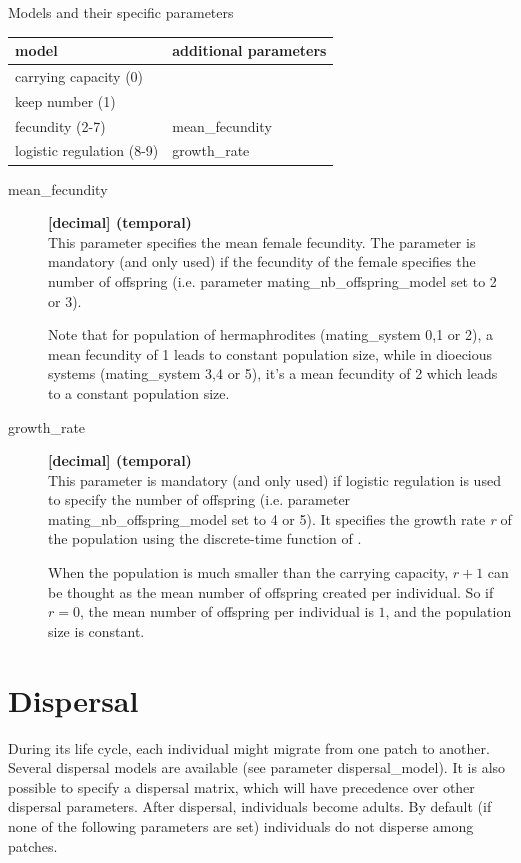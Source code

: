 \documentclass[letterpaper,12pt,oneside]{book}
\begin{document}
Models and their specific parameters\\


\begin{tabular}{ll}
 \hline model                        & additional parameters \\ 
 \hline
 carrying capacity (0)               & \\
 keep number (1)                     & \\
 fecundity (2-7)                     & mean\_fecundity\\
 logistic regulation (8-9)           & growth\_rate\\
 \hline
\end{tabular}
\begin{description}
\item[mean\_fecundity] \textbf{[decimal] (temporal)}\\
This parameter specifies the mean female fecundity. The parameter is mandatory (and only used) if the fecundity of the female specifies the number of offspring (i.e. parameter \textsf{mating\_nb\_offspring\_model} set to 2 or 3).

Note that for population of hermaphrodites (\textsf{mating\_system} 0,1 or 2), a mean fecundity of 1 leads to constant population size, while in dioecious systems (\textsf{mating\_system} 3,4 or 5), it's a mean fecundity of 2 which leads to a constant population size.  

\item[growth\_rate] \textbf{[decimal] (temporal)}\\
This parameter is mandatory (and only used) if logistic regulation is used to specify the number of offspring (i.e. parameter \textsf{mating\_nb\_offspring\_model} set to 4 or 5). It specifies the growth rate \textit{r} of the population using the discrete-time function of \citet{Beverton_1957}.  

When the population is much smaller than the carrying capacity, $r +1$ can be thought as the mean number of offspring created per individual. So if $r=0$, the mean number of offspring per individual is $1$, and the population size is constant. 
\end{description}


\section{Dispersal}\label{sec:Dispersal}
During its life cycle, each individual might migrate from one patch to another. Several dispersal models are available (see parameter \textsf{dispersal\_model}). It is also possible to specify a dispersal matrix, which will have precedence over other dispersal parameters. After dispersal, individuals become adults. By default (if none of the following parameters are set) individuals do not disperse among patches.
\end{document}
